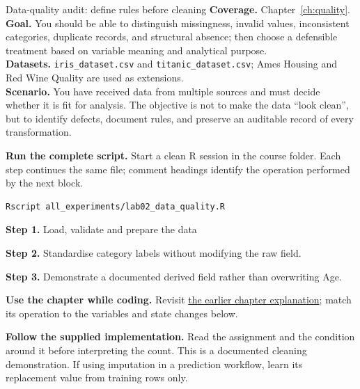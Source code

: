 
\begin{labproject}{Data-quality audit: define rules before cleaning}
\textbf{Coverage.} Chapter~\ref{ch:quality}.\\
\textbf{Goal.} You should be able to distinguish missingness, invalid values, inconsistent categories, duplicate records, and structural absence; then choose a defensible treatment based on variable meaning and analytical purpose.\\
\textbf{Datasets.} \texttt{iris\_dataset.csv} and \texttt{titanic\_dataset.csv}; Ames Housing and Red Wine Quality are used as extensions.\\
\textbf{Scenario.} You have received data from multiple sources and must decide whether it is fit for analysis. The objective is not to make the data ``look clean'', but to identify defects, document rules, and preserve an auditable record of every transformation.



\textbf{Run the complete script.} Start a clean R session in the course folder. Each step continues the same file; comment headings identify the operation performed by the next block.
\begin{lstlisting}[style=utpterminal]
Rscript all_experiments/lab02_data_quality.R
\end{lstlisting}

\noindent\textbf{Step 1.} Load, validate and prepare the data


\noindent\textbf{Step 2.} Standardise category labels without modifying the raw field.



\noindent\textbf{Step 3.} Demonstrate a documented derived field rather than overwriting Age.


\textbf{Use the chapter while coding.} Revisit \hyperref[ch:quality]{the earlier chapter explanation}; match its operation to the variables and state changes below.

\textbf{Follow the supplied implementation.} Read the assignment and the condition around it before interpreting the count. This is a documented cleaning demonstration. If using imputation in a prediction workflow, learn its replacement value from training rows only.



\end{labproject}

